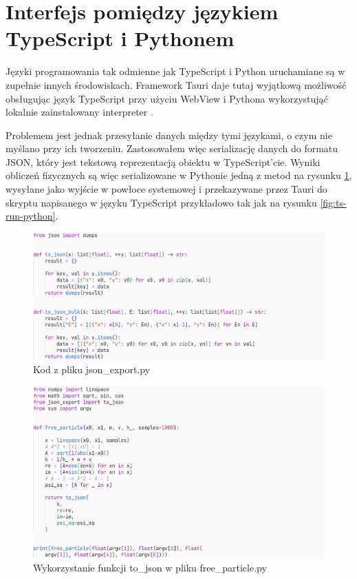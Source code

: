 \documentclass{SGGW-thesis}
\begin{document}
		
	\section{Interfejs pomiędzy językiem TypeScript i Pythonem}
		Języki programowania tak odmienne jak TypeScript i Python uruchamiane są w zupełnie innych środowiskach. Framework Tauri daje tutaj wyjątkową możliwość obsługując język TypeScript przy użyciu WebView \cite{tauri-arch} i Pythona wykorzystująć lokalnie zainstalowany interpreter \cite{tauri-shell}.
		
		Problemem jest jednak przesyłanie danych między tymi językami, o czym nie myślano przy ich tworzeniu. Zastosowałem więc serializację danych do formatu JSON, który jest tekstową reprezentacją obiektu w TypeScript'cie. Wyniki obliczeń fizycznych są więc serializowane w Pythonie jedną z metod na rysunku \ref{fig:to-json}, wysyłane jako wyjście w powłoce systemowej i przekazywane przez Tauri do skryptu napisanego w języku TypeScript przykładowo tak jak na rysunku \ref{fig:ts-run-python}.
		
	\begin{figure}[H]
	\includegraphics[width=\textwidth,height=\textheight,keepaspectratio]{to_json.png} 
	\caption{Kod z pliku json\_export.py}
	\label{fig:to-json}
	\end{figure}	
	
	\begin{figure}[H]
	\includegraphics[width=\textwidth,height=\textheight,keepaspectratio]{free_particle py.png} 
	\caption{Wykorzystanie funkcji to\_json w pliku free\_particle.py}
	\label{fig:free-particle-py}
	\end{figure}
	
\end{document}
